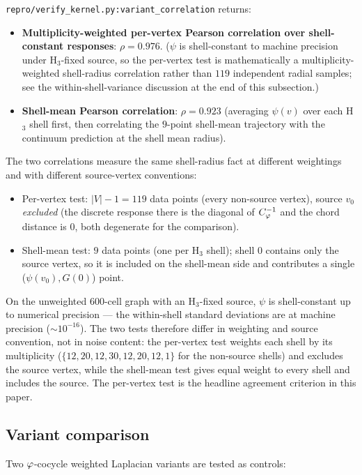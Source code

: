 \texttt{repro/verify\_kernel.py:variant\_correlation} returns:
\begin{itemize}\itemsep=2pt
\item \textbf{Multiplicity-weighted per-vertex Pearson correlation
  over shell-constant responses}: $\rho = 0.976$. ($\psi$ is
  shell-constant to machine precision under H$_3$-fixed source, so
  the per-vertex test is mathematically a multiplicity-weighted
  shell-radius correlation rather than $119$ independent radial
  samples; see the within-shell-variance discussion at the end of
  this subsection.)
\item \textbf{Shell-mean Pearson correlation}: $\rho = 0.923$
  (averaging $\psi(v)$ over each H$_3$ shell first, then
  correlating the $9$-point shell-mean trajectory with the
  continuum prediction at the shell mean radius).
\end{itemize}
The two correlations measure the same shell-radius fact at
different weightings and with different source-vertex conventions:
\begin{itemize}\itemsep=2pt
\item Per-vertex test: $|V|-1 = 119$ data points (every
  non-source vertex), source $v_{0}$ \emph{excluded} (the discrete
  response there is the diagonal of $C_{\varphi}^{-1}$ and the chord
  distance is $0$, both degenerate for the comparison).
\item Shell-mean test: $9$ data points (one per H$_3$ shell);
  shell $0$ contains only the source vertex, so it is included
  on the shell-mean side and contributes a single
  ($\psi(v_{0}), G(0)$) point.
\end{itemize}
On the unweighted 600-cell graph with an H$_3$-fixed source,
$\psi$ is shell-constant up to numerical precision — the
within-shell standard deviations are at machine precision
($\sim 10^{-16}$). The two tests therefore differ in weighting and
source convention, not in noise content: the per-vertex test
weights each shell by its multiplicity
($\{12, 20, 12, 30, 12, 20, 12, 1\}$ for the non-source shells)
and excludes the source vertex, while the shell-mean test gives
equal weight to every shell and includes the source. The
per-vertex test is the headline agreement criterion in this paper.

\subsection{Variant comparison}\label{ssec:variant_comparison}

Two $\varphi$-cocycle weighted Laplacian variants are tested as
controls:


